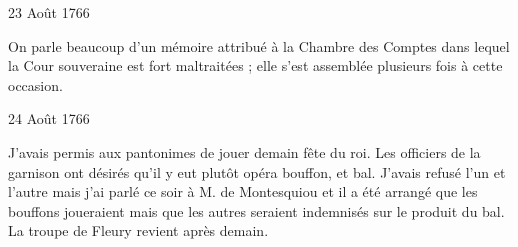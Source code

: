                      \begin{diary}{23 Août 1766}{}

                         On parle beaucoup d'un mémoire attribué
                           à la Chambre des Comptes dans lequel la Cour
                              souveraine
                           est fort maltraitées ; elle s'est assemblée plusieurs
                           fois à cette occasion. \bigskip


                     \end{diary}

                     \begin{diary}{24 Août 1766}{}

                         J'avais permis aux pantonimes de
                           jouer
                           demain fête du roi. Les officiers de la garnison
                           ont désirés qu'il y eut plutôt opéra bouffon,
                           et bal. J'avais refusé l'un et l'autre mais
                           j'ai parlé ce soir à M. de
                              Montesquiou
                           et il a été arrangé que les bouffons joueraient mais que les autres
                           seraient indemnisés sur
                           le produit du bal. La troupe de Fleury
                           revient après demain. \bigskip


                     \end{diary}

